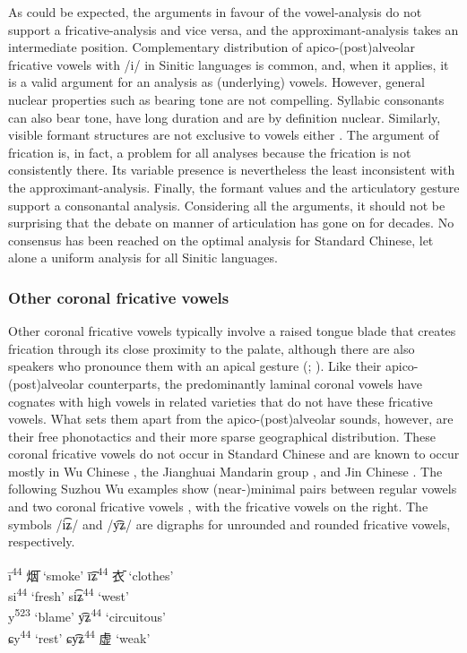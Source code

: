 \documentclass[output=paper,colorlinks,citecolor=brown,chinesefont]{langscibook}
\begin{document}
\newpage
As could be expected, the arguments in favour of the vowel-analysis do not support a fricative-analysis and vice versa, and the approximant-analysis takes an intermediate position. Complementary distribution of apico-(post)alveolar fricative vowels with /i/ in Sinitic languages is common, and, when it applies, it is a valid argument for an analysis as (underlying) vowels. However, general nuclear properties such as bearing tone are not compelling. Syllabic consonants can also bear tone, have long duration and are by definition nuclear. Similarly, visible formant structures are not exclusive to vowels either \citep[35]{Duanmu_2007}. The argument of frication is, in fact, a problem for all analyses because the frication is not consistently there. Its variable presence is nevertheless the least inconsistent with the approximant-analysis. Finally, the formant values and the articulatory gesture support a consonantal analysis. Considering all the arguments, it should not be surprising that the debate on manner of articulation has gone on for decades. No consensus has been reached on the optimal analysis for Standard Chinese, let alone a uniform analysis for all Sinitic languages.

\subsubsection{Other coronal fricative vowels} \label{othercoronal}
Other coronal fricative vowels typically involve a raised tongue blade that creates frication through its close proximity to the palate, although there are also speakers who pronounce them with an apical gesture (\cite{Ling_2009}; \cite{Faytak_2022}). Like their apico-(post)alveolar counterparts, the predominantly laminal coronal vowels have cognates with high vowels in related varieties that do not have these fricative vowels. What sets them apart from the apico-(post)alveolar sounds, however, are their free phonotactics and their more sparse geographical distribution. These coronal fricative vowels do not occur in Standard Chinese and are known to occur mostly in Wu Chinese \citep{Faytak_2018}, the Jianghuai Mandarin group \citep{Shi_1998}, and Jin Chinese \citep{Karlgren_1915}. The following Suzhou Wu examples show (near-)minimal pairs between regular vowels and two coronal fricative vowels \citep[73]{Faytak_2018}, with the fricative vowels on the right. The symbols /i͡ʑ/ and /y͡ʑ/ are digraphs for unrounded and rounded fricative vowels, respectively.

\ea \label{data_Suzhou}
    \begin{tabbing}
        \quad \= i\textsuperscript{44} \quad \={\cn 烟} `smoke' \qquad \quad\= i͡ʑ\textsuperscript{44} \quad \={\cn ⾐} `clothes' \\
        \>si\textsuperscript{44}  `fresh' \> si͡ʑ\textsuperscript{44}  `west'\\        
        \>y\textsuperscript{523}  `blame' \> y͡ʑ\textsuperscript{44}  `circuitous'\\
        \> ɕy\textsuperscript{44}  `rest' \> ɕy͡ʑ\textsuperscript{44} \> {\cn 虚} `weak'
    \end{tabbing}
\z
\end{document}
